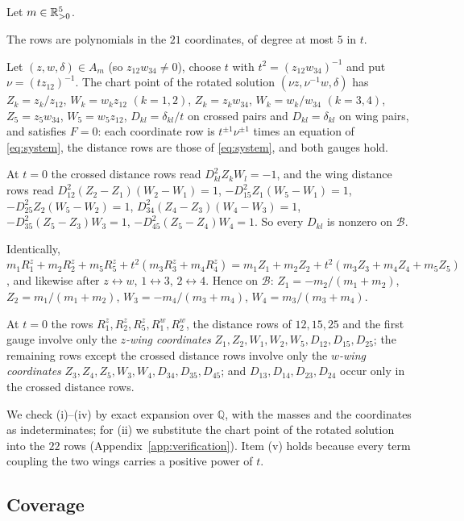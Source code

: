 \begin{lemma}\label{d6-lem-chart}
Let $m\in\mathbb{R}_{>0}^5$.
\begin{romanlist}
  \item The rows are polynomials in the $21$ coordinates, of degree at most $5$ in $t$.
  \item Let $(z,w,\delta)\in A_m$ (so $z_{12}w_{34}\ne0$), choose $t$ with
  $t^2=(z_{12}w_{34})^{-1}$ and put $\nu=(tz_{12})^{-1}$.  The chart point of the rotated
  solution $(\nu z,\nu^{-1}w,\delta)$ has $Z_k=z_k/z_{12}$, $W_k=w_kz_{12}$ $(k=1,2)$,
  $Z_k=z_kw_{34}$, $W_k=w_k/w_{34}$ $(k=3,4)$, $Z_5=z_5w_{34}$, $W_5=w_5z_{12}$,
  $D_{kl}=\delta_{kl}/t$ on crossed pairs and $D_{kl}=\delta_{kl}$ on wing pairs, and satisfies
  $F=0$: each coordinate row is $t^{\pm1}\nu^{\pm1}$ times an equation of \eqref{eq:system}, the
  distance rows are those of \eqref{eq:system}, and both gauges hold.
  \item At $t=0$ the crossed distance rows read $D_{kl}^2Z_kW_l=-1$, and the wing distance rows
  read $D_{12}^2(Z_2-Z_1)(W_2-W_1)=1$, $-D_{15}^2Z_1(W_5-W_1)=1$, $-D_{25}^2Z_2(W_5-W_2)=1$,
  $D_{34}^2(Z_4-Z_3)(W_4-W_3)=1$, $-D_{35}^2(Z_5-Z_3)W_3=1$, $-D_{45}^2(Z_5-Z_4)W_4=1$.  So
  every $D_{kl}$ is nonzero on $\mathcal B$.
  \item Identically,
  $m_1R^z_1+m_2R^z_2+m_5R^z_5+t^2(m_3R^z_3+m_4R^z_4)=m_1Z_1+m_2Z_2+t^2(m_3Z_3+m_4Z_4+m_5Z_5)$,
  and likewise after $z\leftrightarrow w$, $1\leftrightarrow3$, $2\leftrightarrow4$.  Hence on
  $\mathcal B$: $Z_1=-m_2/(m_1+m_2)$, $Z_2=m_1/(m_1+m_2)$, $W_3=-m_4/(m_3+m_4)$,
  $W_4=m_3/(m_3+m_4)$.
  \item At $t=0$ the rows $R^z_1,R^z_2,R^z_5,R^w_1,R^w_2$, the distance rows of $12,15,25$ and
  the first gauge involve only the \emph{$z$-wing coordinates}
  $Z_1,Z_2,W_1,W_2,W_5,D_{12},D_{15},D_{25}$; the remaining rows except the crossed distance rows
  involve only the \emph{$w$-wing coordinates} $Z_3,Z_4,Z_5,W_3,W_4,D_{34},D_{35},D_{45}$; and
  $D_{13},D_{14},D_{23},D_{24}$ occur only in the crossed distance rows.
\end{romanlist}
\end{lemma}
We check (i)--(iv) by exact expansion over $\mathbb Q$, with the masses and the coordinates as
indeterminates; for (ii) we substitute the chart point of the rotated solution into the $22$
rows (Appendix~\ref{app:verification}).  Item (v) holds because every term coupling the two
wings carries a positive power of $t$.

\subsection{Coverage}

